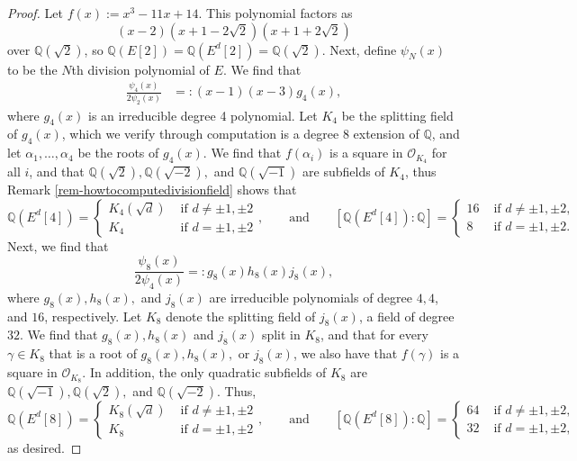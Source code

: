 \documentclass[11pt]{amsart}
\theoremstyle{definition}
\newcommand{\Q}{\mathbb Q}
\newcommand{\OO}{\mathcal{O}}
\begin{document}
\begin{proof}
Let $f(x) := x^3 - 11x + 14$. This polynomial factors as
\[ (x - 2)(x + 1 - 2\sqrt{2})(x + 1 + 2 \sqrt{2}) \]
over $\Q(\sqrt{2})$, so $\Q(E[2]) = \Q(E^{d}[2]) = \Q(\sqrt{2})$. Next, define $\psi_N(x)$ to be the $N$th division polynomial of $E$. We find that 
\begin{align*}
    \frac{\psi_4(x)}{2\psi_2(x)} 
    &=: (x-1)(x-3)g_4(x),
\end{align*}
where $g_4(x)$ is an irreducible degree 4 polynomial. Let $K_4$ be the splitting field of $g_4(x)$, which we verify through computation is a degree $8$ extension of $\Q$, and let $\alpha_1, \dotsc, \alpha_4$ be the roots of $g_4(x)$. We find that $f(\alpha_i)$ is a square in $\OO_{K_4}$ for all $i$, and that $\Q(\sqrt{2}), \Q(\sqrt{-2}),$ and $\Q(\sqrt{-1})$ are subfields of $K_4$, thus Remark \ref{rem-howtocomputedivisionfield} shows that 
\[ \Q(E^{d}[4]) = 
\begin{cases}
K_{4}(\sqrt{d}) & \text{ if } d \neq \pm 1, \pm 2 \\
K_{4} & \text{ if } d = \pm 1, \pm 2
\end{cases}, \qquad \text{and} \qquad [\Q(E^{d}[4]) : \Q] = 
\begin{cases}
16 & \text{ if } d \neq \pm 1, \pm 2, \\
8 & \text{ if } d = \pm 1, \pm 2.
\end{cases} \]
Next, we find that 
\[ \frac{\psi_8(x)}{2 \psi_4(x)} =: g_8(x) h_8(x) j_8(x),\]
where $g_8(x), h_8(x),$ and $j_8(x)$ are irreducible polynomials of degree $4, 4$, and $16$, respectively. Let $K_8$ denote the splitting field of $j_8(x)$, a field of degree $32$. We find that $g_8(x), h_8(x)$ and $j_8(x)$ split in $K_8$, and that for every $\gamma \in K_8$ that is a root of $g_8(x), h_8(x),$ or $j_8(x)$, we also have that $f(\gamma)$ is a square in $\OO_{K_8}$. In addition, the only quadratic subfields of $K_8$ are $\Q(\sqrt{-1}), \Q(\sqrt{2}),$ and $ \Q(\sqrt{-2})$. Thus,
\[ \Q(E^{d}[8]) = 
\begin{cases}
K_{8}(\sqrt{d}) & \text{ if } d \neq \pm 1, \pm 2 \\
K_{8} & \text{ if } d = \pm 1, \pm 2
\end{cases}, \qquad \text{and} \qquad [\Q(E^{d}[8]) : \Q] = 
\begin{cases}
64 & \text{ if } d \neq \pm 1, \pm 2, \\
32 & \text{ if } d = \pm 1, \pm 2,
\end{cases} \]
as desired.
\end{proof}
\end{document}
